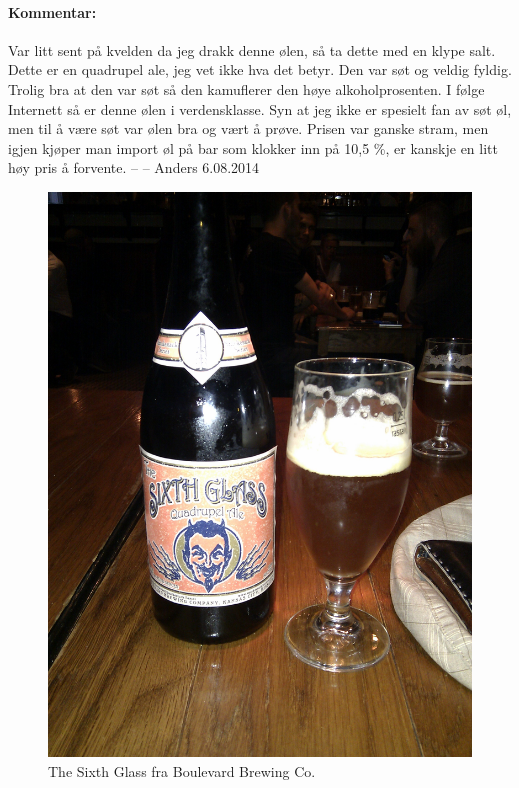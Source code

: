 \documentclass[12pt,a4paper,oneside,norsk]{article}
\begin{document}
\paragraph{Kommentar:}Var litt sent på kvelden da jeg drakk denne ølen, så ta dette med en klype salt. Dette er en quadrupel ale, jeg vet ikke hva det betyr. Den var søt og veldig fyldig. Trolig bra at den var søt så den kamuflerer den høye alkoholprosenten. I følge Internett så er denne ølen i verdensklasse. Syn at jeg ikke er spesielt fan av søt øl, men til å være søt var ølen bra og vært å prøve. Prisen var ganske stram, men igjen kjøper man import øl på bar som klokker inn på 10,5 \%, er kanskje en litt høy pris å forvente. 
\newline
-- -- Anders 6.08.2014

\begin{figure} [H]
\centering
\includegraphics[scale=0.1, angle=0]{Bilder/Ol/Thesixth}
\caption{The Sixth Glass fra Boulevard Brewing Co.}
\end{figure}
\end{document}
